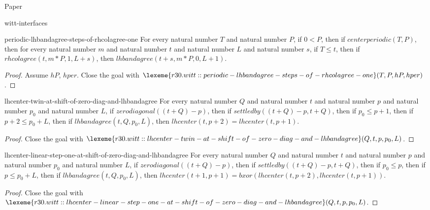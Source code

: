 \begin{lexlean}{Paper}
\begin{section}{witt-interfaces}
  \begin{theorem}{periodic-lhbandagree-steps-of-rhcolagree-one}
  For every natural number \(T\) and natural number \(P\), if \(0 < P\), then if \(centerperiodic(T, P)\), then for every natural number \(m\) and natural number \(t\) and natural number \(L\) and natural number \(s\), if \(T ≤ t\), then if \(rhcolagree(t, m * P, 1, L + s)\), then \(lhbandagree(t + s, m * P, 0, L + 1)\).
  \begin{proof}
  Assume \(hP\), \(hper\).
  Close the goal with \(\lexeme{r30.witt::periodic-lhbandagree-steps-of-rhcolagree-one}(T, P, hP, hper)\).
  \end{proof}
  \end{theorem}

  \begin{theorem}{lhcenter-twin-at-shift-of-zero-diag-and-lhbandagree}
  For every natural number \(Q\) and natural number \(t\) and natural number \(p\) and natural number \(p_0\) and natural number \(L\), if \(zerodiagonal((t + Q) - p)\), then if \(settledby((t + Q) - p, t + Q)\), then if \(p_0 ≤ p + 1\), then if \(p + 2 ≤ p_0 + L\), then if \(lhbandagree(t, Q, p_0, L)\), then \(lhcenter(t, p + 2) = lhcenter(t, p + 1)\).
  \begin{proof}
  Close the goal with \(\lexeme{r30.witt::lhcenter-twin-at-shift-of-zero-diag-and-lhbandagree}(Q, t, p, p_0, L)\).
  \end{proof}
  \end{theorem}

  \begin{theorem}{lhcenter-linear-step-one-at-shift-of-zero-diag-and-lhbandagree}
  For every natural number \(Q\) and natural number \(t\) and natural number \(p\) and natural number \(p_0\) and natural number \(L\), if \(zerodiagonal((t + Q) - p)\), then if \(settledby((t + Q) - p, t + Q)\), then if \(p_0 ≤ p\), then if \(p ≤ p_0 + L\), then if \(lhbandagree(t, Q, p_0, L)\), then \(lhcenter(t + 1, p + 1) = bxor(lhcenter(t, p + 2), lhcenter(t, p + 1))\).
  \begin{proof}
  Close the goal with \(\lexeme{r30.witt::lhcenter-linear-step-one-at-shift-of-zero-diag-and-lhbandagree}(Q, t, p, p_0, L)\).
  \end{proof}
  \end{theorem}


\end{section}
\end{lexlean}
